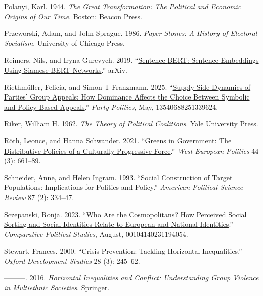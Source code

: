 \documentclass[12pt]{article}
\begin{document}
\begin{CSLReferences}{1}{0}
Polanyi, Karl. 1944. \emph{The Great Transformation: The Political and Economic Origins of Our Time}. Boston: Beacon Press.

Przeworski, Adam, and John Sprague. 1986. \emph{Paper Stones: A History of Electoral Socialism}. University of Chicago Press.

Reimers, Nils, and Iryna Gurevych. 2019. {``\href{https://doi.org/10.48550/arXiv.1908.10084}{Sentence-{BERT}: Sentence Embeddings Using Siamese {BERT}-Networks}.''} {arXiv}.

Riethmüller, Felicia, and Simon T Franzmann. 2025. {``\href{https://doi.org/10.1177/13540688251339624}{Supply-Side Dynamics of Parties' Group Appeals: How Dominance Affects the Choice Between Symbolic and Policy-Based Appeals}.''} \emph{Party Politics}, May, 13540688251339624.

Riker, William H. 1962. \emph{The Theory of Political Coalitions}. Yale University Press.

Röth, Leonce, and Hanna Schwander. 2021. {``\href{https://doi.org/10.1080/01402382.2019.1702792}{Greens in Government: The Distributive Policies of a Culturally Progressive Force}.''} \emph{West European Politics} 44 (3): 661--89.

Schneider, Anne, and Helen Ingram. 1993. {``Social Construction of Target Populations: Implications for Politics and Policy.''} \emph{American Political Science Review} 87 (2): 334--47.

Sczepanski, Ronja. 2023. {``\href{https://doi.org/10.1177/00104140231194054}{Who Are the Cosmopolitans? How Perceived Social Sorting and Social Identities Relate to European and National Identities}.''} \emph{Comparative Political Studies}, August, 00104140231194054.

Stewart, Frances. 2000. {``Crisis Prevention: Tackling Horizontal Inequalities.''} \emph{Oxford Development Studies} 28 (3): 245--62.

---------. 2016. \emph{Horizontal Inequalities and Conflict: Understanding Group Violence in Multiethnic Societies}. Springer.


\end{CSLReferences}
\end{document}
